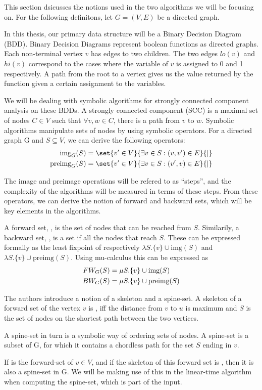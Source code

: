 \documentclass[../master/master.tex]{subfiles}
\begin{document}

This section dsicusses the notions used in the two algorithms we will be focusing on. For the following definitons, let $G=(V,E)$ be a directed graph.

In this thesis, our primary data structure will be a Binary Decision Diagram (BDD). Binary Decision Diagrams represent boolean functions as directed graphs. Each non-terminal vertex $v$ has edges to two children. The two edges $lo(v)$ and $hi(v)$ correspond to the cases where the variable of $v$ is assigned to 0 and 1 respectively. A path from the root to a vertex gives us the value returned by the function given a certain assignment to the variables. 

We will be dealing with symbolic algorithms for strongly connected component analysis on these BDDs. A strongly connected component (SCC) is a maximal set of nodes $C\in V$ such that $\forall v,w\in C$, there is a path from $v$ to $w$. Symbolic algorithms manipulate sets of nodes by using symbolic operators. For a directed graph G and $S\subseteq V$, we can derive the following operators: 
\begin{align*}
\img S &= \set{v' \in V}{\exists v\in S:(v, v')\in E}{|}\\
\pre S &= \set{v' \in V}{\exists v\in S:(v', v)\in E}{|}
\end{align*}

The image and preimage operations will be refered to as ``steps'', and the complexity of the algorithms will be measured in terms of these steps. 
From these operators, we can derive the notion of forward and backward sets, which will be key elements in the algorithms.

A forward set, , is the set of nodes that can be reached from $S$. Similarily, a backward set, , is a set if all the nodes that reach $S$. These can be expressed formally as the least fixpoint of respectively $\lambda S.\{v\}\cup \text{img}(S)$ and $\lambda S.\{v\}\cup \text{preimg}(S)$. Using mu-calculus \cite{clarke_peled_grumberg_1999} this can be expressed as 
\begin{align}\label{fw}
FW_{G}(S) &= \mu S.\{v\}\cup \text{img}(S)\\
\label{bw}BW_{G}(S) &= \mu S.\{v\}\cup \text{preimg}(S)
\end{align}

The authors \cite{linear} introduce a notion of a skeleton and a spine-set. A skeleton of a forward set of the vertex $v$  is , iff the distance from $v$ to $u$ is maximum and $S$ is the set of nodes on the shortest path between the two vertices.

A spine-set in turn is a symbolic way of ordering sets of nodes. A spine-set is a subset  of G, for which it contains a chordless path for the set $S$ ending in $v$.

If  is the forward-set of $v \in V$, and if the skeleton of this forward set is , then it is also a spine-set in G. We will be making use of this in the linear-time algorithm when computing the spine-set, which is part of the input. 
\end{document}

